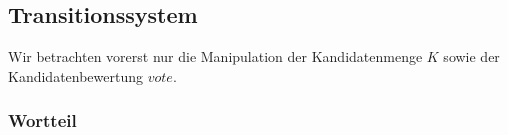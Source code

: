 \documentclass[]{article}
\begin{document}






\subsection{Transitionssystem}

Wir betrachten vorerst nur die Manipulation der Kandidatenmenge $K$ sowie der Kandidatenbewertung $vote$. 


% 


% 

\subsubsection*{Wortteil}
\end{document}
